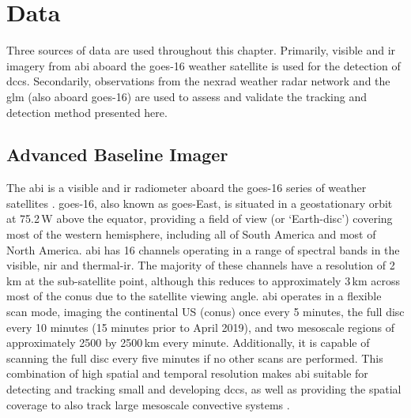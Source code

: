 

\section{Data}

Three sources of data are used throughout this chapter.
Primarily, visible and \acrshort{ir} imagery from \acrshort{abi} aboard the \acrshort{goes}-16 weather satellite is used for the detection of \acrshort{dcc}s.
Secondarily, observations from the \acrshort{nexrad} weather radar network and the \acrshort{glm} (also aboard \acrshort{goes}-16) are used to assess and validate the tracking and detection method presented here.


\subsection{Advanced Baseline Imager} \label{sec:abi_data}


The \acrshort{abi} is a visible and \acrshort{ir} radiometer aboard the \acrshort{goes}-16 series of weather satellites \citep{schmit_closer_2016}.
\acrshort{goes}-16, also known as \acrshort{goes}-East, is situated in a geostationary orbit at 75.2\,\textdegree W above the equator, providing a field of view (or `Earth-disc') covering most of the western hemisphere, including all of South America and most of North America.
\acrshort{abi} has 16 channels operating in a range of spectral bands in the visible, \acrshort{nir} and thermal-\acrshort{ir}.
The majority of these channels have a resolution of 2\,\unit{km} at the sub-satellite point, although this reduces to approximately 3\,\unit{km} across most of the \acrfull{conus} due to the satellite viewing angle.
\acrshort{abi} operates in a flexible scan mode, imaging the continental US (\acrshort{conus}) once every 5 minutes, the full disc every 10 minutes (15 minutes prior to April 2019), and two mesoscale regions of approximately 2500 by 2500\,\unit{km} every minute.
Additionally, it is capable of scanning the full disc every five minutes if no other scans are performed.
This combination of high spatial and temporal resolution makes \acrshort{abi} suitable for detecting and tracking small and developing \acrshort{dcc}s, as well as providing the spatial coverage to also track large mesoscale convective systems \citep{heikenfeld_tobac_2019}.

